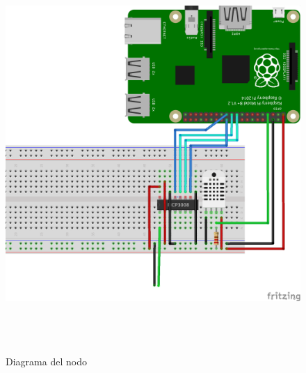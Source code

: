\begin{figure}[htb]
	
	\begin{center}
		\includegraphics[width=15cm,height=15cm]{figures/solar_project_node_diagram.png}
		\caption{Diagrama del nodo}
	\end{center}
	
	\label{node-diagram}
\end{figure}